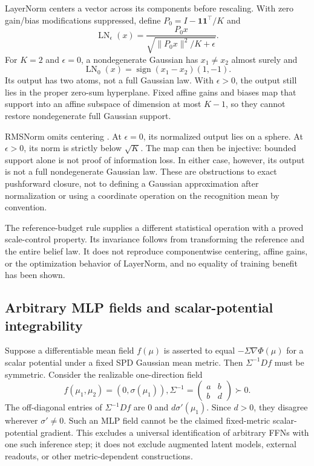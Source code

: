\documentclass[11pt]{article}
\begin{document}
LayerNorm \citep{Ba2016} centers a vector across its components before rescaling. With zero gain/bias modifications suppressed, define $P_0=I-\mathbf1\mathbf1^\top/K$ and
\begin{equation}
\operatorname{LN}_{\epsilon}(x)=\frac{P_0x}
 {\sqrt{\|P_0x\|^2/K+\epsilon}}.
\label{eq:layernorm}
\end{equation}
For $K=2$ and $\epsilon=0$, a nondegenerate Gaussian has $x_1\ne x_2$ almost surely and
\begin{equation}
\operatorname{LN}_{0}(x)=\operatorname{sign}(x_1-x_2)(1,-1).
\label{eq:lntwopoint}
\end{equation}
Its output has two atoms, not a full Gaussian law. With $\epsilon>0$, the output still lies in the proper zero-sum hyperplane. Fixed affine gains and biases map that support into an affine subspace of dimension at most $K-1$, so they cannot restore nondegenerate full Gaussian support.

RMSNorm omits centering \citep{ZhangSennrich2019}. At $\epsilon=0$, its normalized output lies on a sphere. At $\epsilon>0$, its norm is strictly below $\sqrt K$. The map can then be injective: bounded support alone is not proof of information loss. In either case, however, its output is not a full nondegenerate Gaussian law. These are obstructions to exact pushforward closure, not to defining a Gaussian approximation after normalization or using a coordinate operation on the recognition mean by convention.

The reference-budget rule supplies a different statistical operation with a proved scale-control property. Its invariance follows from transforming the reference and the entire belief law. It does not reproduce componentwise centering, affine gains, or the optimization behavior of LayerNorm, and no equality of training benefit has been shown.

\subsection{Arbitrary MLP fields and scalar-potential integrability}

Suppose a differentiable mean field $f(\mu)$ is asserted to equal $-\Sigma\nabla\Phi(\mu)$ for a scalar potential under a fixed SPD Gaussian mean metric. Then $\Sigma^{-1}Df$ must be symmetric. Consider the realizable one-direction field
\begin{equation}
f(\mu_1,\mu_2)=(0,\sigma(\mu_1)),
\Sigma^{-1}=\begin{pmatrix}a&b\\b&d\end{pmatrix}\succ0.
\label{eq:mlpfield}
\end{equation}
The off-diagonal entries of $\Sigma^{-1}Df$ are $0$ and $d\sigma'(\mu_1)$. Since $d>0$, they disagree wherever $\sigma'\ne0$. Such an MLP field cannot be the claimed fixed-metric scalar-potential gradient. This excludes a universal identification of arbitrary FFNs with one such inference step; it does not exclude augmented latent models, external readouts, or other metric-dependent constructions.
\end{document}

